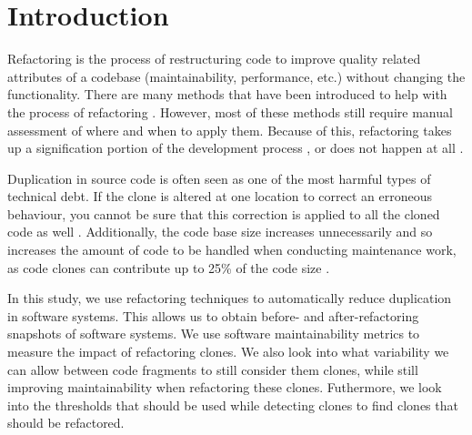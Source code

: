 \chapter{Introduction}
\label{ch:introduction}
Refactoring is the process of restructuring code to improve quality related attributes of a codebase (maintainability, performance, etc.) without changing the functionality. There are many methods that have been introduced to help with the process of refactoring \cite{fowler2018refactoring, wake2004refactoring}. However, most of these methods still require manual assessment of where and when to apply them. Because of this, refactoring takes up a signification portion of the development process \cite{lientz1978characteristics, mens2004survey}, or does not happen at all \cite{mens2003refactoring}. %

Duplication in source code is often seen as one of the most harmful types of technical debt. If the clone is altered at one location to correct an erroneous behaviour, you cannot be sure that this correction is applied to all the cloned code as well \cite{ostberg2014automatically}. Additionally, the code base size increases unnecessarily and so increases the amount of code to be handled when conducting maintenance work, as code clones can contribute up to 25\% of the code size \cite{bruntink2005use}.


In this study, we use refactoring techniques to automatically reduce duplication in software systems. This allows us to obtain before- and after-refactoring snapshots of software systems. We use software maintainability metrics to measure the impact of refactoring clones. We also look into what variability we can allow between code fragments to still consider them clones, while still improving maintainability when refactoring these clones. Futhermore, we look into the thresholds that should be used while detecting clones to find clones that should be refactored.

